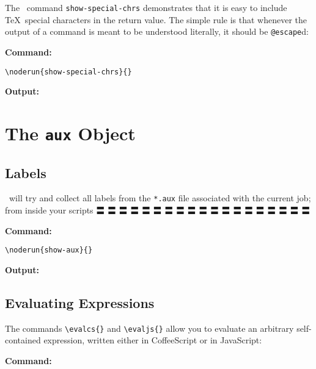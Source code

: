 \documentclass[a4paper]{article}
\makeatletter
\newenvironment{jzrplain}{%
  \lineskiplimit=-10pt%
  \lineskip=0pt%
  \topskip=0pt%
  \setlength{\parskip}{4mm}%
  \setlength{\parindent}{0mm}%
  \leading{4mm}
  }%
  {\par}
\makeatother
\begin{document}
\begin{jzrplain}
The \CX\ command \verb#show-special-chrs# demonstrates that it is easy to include \TeX\ special characters
in the return value. The simple rule is that whenever the output of a command is meant to be understood
literally, it should be \verb#@escape#d:

{\textbf{Command:}}

\begin{verbatim}
\noderun{show-special-chrs}{}
\end{verbatim}

{\textbf{Output:}}



\clearpage\section{The \texttt{aux} Object}\label{aux}



\subsection{Labels}\label{labels}

\CX\ will try and collect all labels from the \verb#*.aux# file associated with the current job; from
inside your scripts 〓 〓 〓 〓 〓 〓 〓 〓 〓 〓 〓 〓 〓 〓 〓 〓 〓 〓 〓

{\textbf{Command:}}

\begin{verbatim}
\noderun{show-aux}{}
\end{verbatim}

{\textbf{Output:}}

{\fontsize{3mm}{3mm}}


\subsection{Evaluating Expressions}\label{evalcs}

The commands \verb#\evalcs{}# and \verb#\evaljs{}# allow you to evaluate an arbitrary self-contained
expression, written either in CoffeeScript or in JavaScript:

{\textbf{Command:}}


\end{jzrplain}
\end{document}
